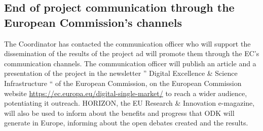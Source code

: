 \documentclass{deliverablereport}
\begin{document}


\subsection{End of project communication through the European Commission's channels}

The Coordinator has contacted the communication officer  who will support the dissemination
of the results of the project ad will promote them through the EC's communication channels. 
The communication officer will publish an article and a presentation of the project in the 
newsletter ” Digital Excellence \& Science Infrastructure “ of the European Commission, 
on the European Commission website \url{https://ec.europa.eu/digital-single-market/} to reach 
a wider audience, potentiating it outreach. 
HORIZON, the EU Research \& Innovation e-magazine, will also be used to inform about 
the benefits and progress that ODK will generate in Europe, informing about 
the open debates created and the results.

\clearpage
\appendix

\clearpage

\end{document}
